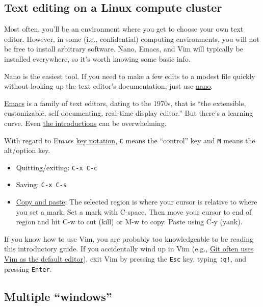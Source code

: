 \subsection{Text editing on a Linux compute cluster}

Most often, you'll be an environment where you get to choose your own text editor.
However, in some (i.e., confidential) computing environments, you will not be free to install arbitrary software.
Nano, Emacs, and Vim will typically be installed everywhere, so it's worth knowing some basic info.

Nano is the easiest tool.
If you need to make a few edits to a modest file quickly without looking up the text editor's documentation, just use \href{https://www.nano-editor.org/docs.php}{nano}.

\href{https://en.wikipedia.org/wiki/Emacs}{Emacs} is a family of text editors, dating to the 1970s, that is ``the extensible, customizable, self-documenting, real-time display editor.''
But there's a learning curve.
Even \href{https://www.gnu.org/software/emacs/tour/}{the introductions} can be overwhelming.

With regard to Emacs \href{https://www.emacswiki.org/emacs/EmacsKeyNotation}{key notation},
\texttt{C} means the ``control'' key and \texttt{M} means the alt/option key.

\begin{itemize}
	\item Quitting/exiting: \texttt{C-x C-c}
	\item Saving: \texttt{C-x C-s}
	\item \href{https://www.emacswiki.org/emacs/CopyAndPaste}{Copy and paste}:
	The selected region is where your cursor is relative to where you set a mark.
	Set a mark with C-space.
	Then move your cursor to end of region and hit C-w to cut (kill) or M-w to copy.
	Paste using C-y (yank).
\end{itemize}

If you know how to use Vim, you are probably too knowledgeable to be reading this introductory guide.
If you accidentally wind up in Vim (e.g., \href{https://www.oreilly.com/library/view/gitlab-cookbook/9781783986842/apas07.html}{Git often uses Vim as the default editor}),
exit Vim by pressing the \texttt{Esc} key, typing \texttt{:q!}, and pressing \texttt{Enter}.

\subsection{Multiple ``windows''}

